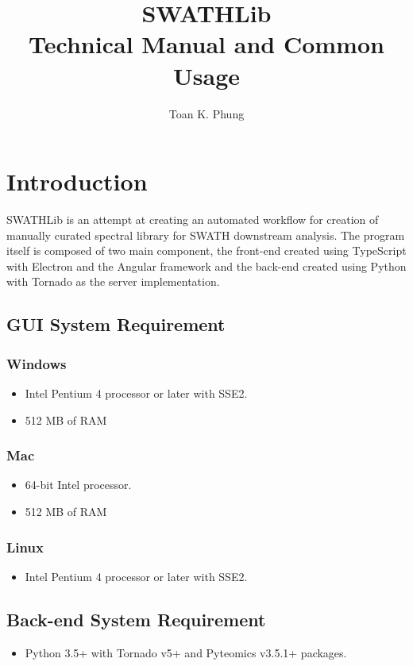 \documentclass[10pt,a4paper]{memoir}
\title{%
SWATHLib \\
\large Technical Manual and Common Usage}
\author{Toan K. Phung}
\begin{document}
\maketitle
\tableofcontents
\frontmatter
\section{Introduction}
SWATHLib is an attempt at creating an automated workflow for creation of manually curated spectral library for SWATH downstream analysis. The program itself is composed of two main component, the front-end created using TypeScript with Electron and the Angular framework and the back-end created using Python with Tornado as the server implementation.
\subsection{GUI System Requirement}
\subsubsection{Windows}

\begin{itemize}
\item Intel Pentium 4 processor or later with SSE2.
\item 512 MB of RAM
\end{itemize}
\subsubsection{Mac}
\begin{itemize}
    \item 64-bit Intel processor.
    \item 512 MB of RAM
\end{itemize}
\subsubsection{Linux}    
\begin{itemize}
    \item Intel Pentium 4 processor or later with SSE2.
    \end{itemize}
\subsection{Back-end System Requirement}
\begin{itemize}
    \item Python 3.5+ with Tornado v5+ and Pyteomics v3.5.1+ packages.
\end{itemize}
\clearpage
\end{document}
